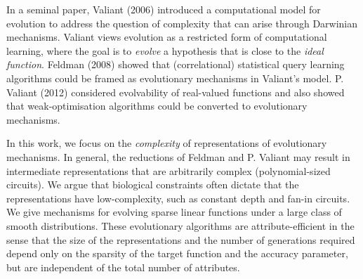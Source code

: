 In a seminal paper, Valiant (2006) introduced a computational model for
evolution to address the question of complexity that can arise through Darwinian
mechanisms. Valiant views evolution as a restricted form of computational
learning, where the goal is to \emph{evolve} a hypothesis that is close to the
\emph{ideal function}. Feldman (2008) showed that (correlational) statistical
query learning algorithms
could be framed as evolutionary mechanisms in Valiant's model. P. Valiant (2012)
considered evolvability of real-valued functions and also showed that
weak-optimisation algorithms could be converted to evolutionary mechanisms.

In this work, we focus on the \emph{complexity} of representations of
evolutionary mechanisms. In general, the reductions of Feldman and P. Valiant
may result in intermediate representations that are arbitrarily complex
(polynomial-sized circuits). We argue that biological constraints often dictate
that the representations have low-complexity, such as constant depth and fan-in
circuits. We give mechanisms for evolving sparse linear functions under a large
class of smooth distributions. These evolutionary algorithms are
attribute-efficient in the sense that the size of the representations and the
number of generations required depend only on the sparsity of the target
function and the accuracy parameter, but are independent of the total number of
attributes.
